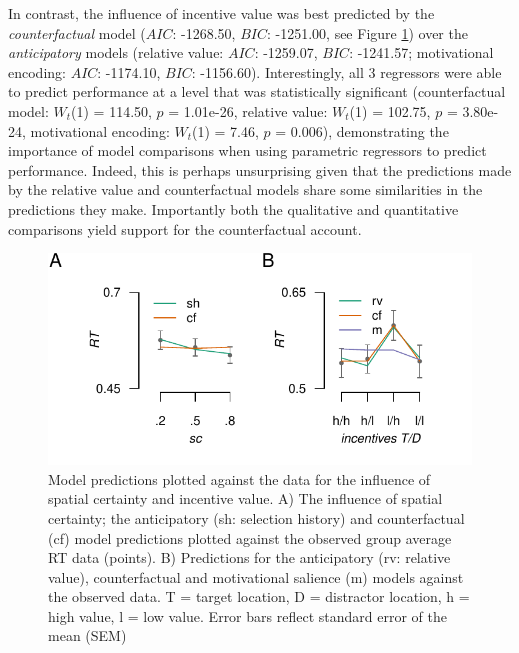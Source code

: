 \documentclass[11pt,halfline,a4paper,]{ouparticle}
\begin{document}
In contrast, the influence of incentive value was best predicted by the \emph{counterfactual} model (\(AIC\): -1268.50, \(BIC\): -1251.00, see Figure \ref{fig:grplvlmodelfits}) over the \emph{anticipatory} models (relative value: \(AIC\): -1259.07, \(BIC\): -1241.57; motivational encoding: \(AIC\): -1174.10, \(BIC\): -1156.60). Interestingly, all 3 regressors were able to predict performance at a level that was statistically significant (counterfactual model: \(W_{t}\)(1) = 114.50, \(p\) = 1.01e-26, relative value: \(W_{t}\)(1) = 102.75, \(p\) = 3.80e-24, motivational encoding: \(W_{t}\)(1) = 7.46, \(p\) = 0.006), demonstrating the importance of model comparisons when using parametric regressors to predict performance. Indeed, this is perhaps unsurprising given that the predictions made by the relative value and counterfactual models share some similarities in the predictions they make. Importantly both the qualitative and quantitative comparisons yield support for the counterfactual account.

\begin{figure}[p]

{\centering \includegraphics[width=1\linewidth]{../images/doc-grp-lvl-model-fits} 

}

\caption{Model predictions plotted against the data for the influence of spatial certainty and incentive value. A) The influence of spatial certainty; the anticipatory (sh: selection history) and counterfactual (cf) model predictions plotted against the observed group average RT data (points). B) Predictions for the anticipatory (rv: relative value), counterfactual and motivational salience (m) models against the observed data. T = target location, D = distractor location, h = high value, l = low value. Error bars reflect standard error of the mean (SEM)}\label{fig:grplvlmodelfits}
\end{figure}
\end{document}
